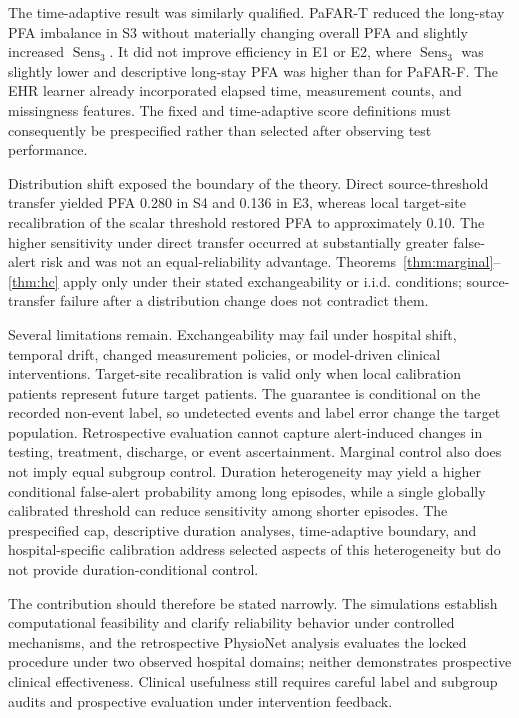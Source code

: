 \documentclass[11pt]{article}
\newcommand{\Sens}{\operatorname{Sens}}
\begin{document}
The time-adaptive result was similarly qualified. PaFAR-T reduced the long-stay PFA imbalance in S3 without materially changing overall PFA and slightly increased $\Sens_3$. It did not improve efficiency in E1 or E2, where $\Sens_3$ was slightly lower and descriptive long-stay PFA was higher than for PaFAR-F. The EHR learner already incorporated elapsed time, measurement counts, and missingness features. The fixed and time-adaptive score definitions must consequently be prespecified rather than selected after observing test performance.

Distribution shift exposed the boundary of the theory. Direct source-threshold transfer yielded PFA 0.280 in S4 and 0.136 in E3, whereas local target-site recalibration of the scalar threshold restored PFA to approximately 0.10. The higher sensitivity under direct transfer occurred at substantially greater false-alert risk and was not an equal-reliability advantage. Theorems~\ref{thm:marginal}--\ref{thm:hc} apply only under their stated exchangeability or i.i.d. conditions; source-transfer failure after a distribution change does not contradict them.

Several limitations remain. Exchangeability may fail under hospital shift, temporal drift, changed measurement policies, or model-driven clinical interventions. Target-site recalibration is valid only when local calibration patients represent future target patients. The guarantee is conditional on the recorded non-event label, so undetected events and label error change the target population. Retrospective evaluation cannot capture alert-induced changes in testing, treatment, discharge, or event ascertainment. Marginal control also does not imply equal subgroup control. Duration heterogeneity may yield a higher conditional false-alert probability among long episodes, while a single globally calibrated threshold can reduce sensitivity among shorter episodes. The prespecified cap, descriptive duration analyses, time-adaptive boundary, and hospital-specific calibration address selected aspects of this heterogeneity but do not provide duration-conditional control.

The contribution should therefore be stated narrowly. The simulations establish computational feasibility and clarify reliability behavior under controlled mechanisms, and the retrospective PhysioNet analysis evaluates the locked procedure under two observed hospital domains; neither demonstrates prospective clinical effectiveness. Clinical usefulness still requires careful label and subgroup audits and prospective evaluation under intervention feedback.
\end{document}
